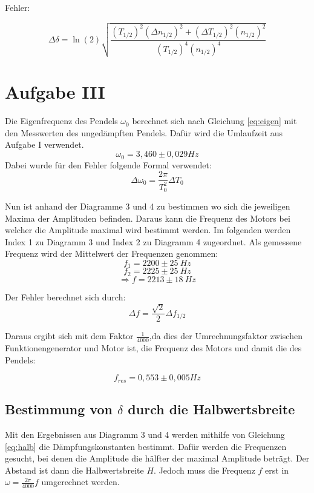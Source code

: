 Fehler:

\[\Delta \delta=\ln(2) \sqrt{\frac{(T_{1/2})^{2} (\Delta n_{1/2})^{2} + (\Delta T_{1/2})^{2} (n_{1/2})^{2}}{(T_{1/2})^{4} (n_{1/2})^{4}}}\]


\section{Aufgabe III}

Die Eigenfrequenz des Pendels $\omega_0$ berechnet sich nach Gleichung \ref{eq:eigen} mit den Messwerten des ungedämpften Pendels.
Dafür wird die Umlaufzeit aus Aufgabe I verwendet.
\[\omega_0 = 3,460 \pm 0,029 \si{Hz}\]
Dabei wurde für den Fehler folgende Formal verwendet:
\begin{equation}
   \Delta \omega_0 = \frac{2\pi}{T_0^2}\Delta T_0
\end{equation}

Nun ist anhand der Diagramme 3 und 4 zu bestimmen wo sich die jeweiligen Maxima der Amplituden befinden.
Daraus kann die Frequenz des Motors bei welcher die Amplitude  maximal wird bestimmt werden.
Im folgenden werden Index 1 zu Diagramm 3 und Index 2 zu Diagramm 4 zugeordnet.
Als gemessene Frequenz wird der Mittelwert der Frequenzen genommen:
\[ f_1 = 2200 \pm 25\ \si{Hz}\]
\[ f_2 = 2225 \pm 25\ \si{Hz} \]
\[\Rightarrow f = 2213 \pm 18 \ \si{Hz}\]

Der Fehler berechnet sich durch:
\begin{equation}
    \Delta f = \frac{\sqrt{2}}{2}\Delta f_{1/2}
\end{equation}

Daraus ergibt sich mit dem Faktor $\frac{1}{4000}$,da dies der Umrechnungsfaktor zwischen Funktionengenerator und Motor ist, die Frequenz des Motors und damit die des Pendels:

\[f_{res} = 0,553 \pm 0,005 \si{Hz}\]

\subsection{Bestimmung von $\delta$ durch die Halbwertsbreite}

Mit den Ergebnissen aus Diagramm 3 und 4 werden mithilfe von Gleichung \ref{eq:halb} die Dämpfungskonstanten bestimmt.
Dafür werden die Frequenzen gesucht, bei denen die Amplitude die hälfter der maximal Amplitude beträgt. Der Abstand ist dann die Halbwertsbreite $H$.
Jedoch muss die Frequenz $f$ erst in $\omega = \frac{2 \pi}{4000} f$ umgerechnet werden.


